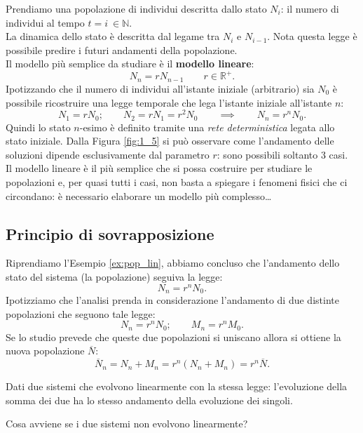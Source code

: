 \noindent
\begin{exmp}
    \label{ex:pop_lin}
   Prendiamo una popolazione di individui descritta dallo stato $N_i$: il numero di individui al tempo $t=i \ \in \mathbb{N}$. \\
   La dinamica dello stato è descritta dal legame tra $N_i$ e $N_{i-1}$. Nota questa legge è possibile predire i futuri andamenti della popolazione.\\
   Il modello più semplice da studiare è il \textbf{modello lineare}:
   \[
       N_n = r N_{n-1} \qquad r \in \mathbb{R}^+
   .\] 
   Ipotizzando che il numero di individui all'istante iniziale (arbitrario) sia $N_0$ è possibile ricostruire una legge temporale che lega l'istante iniziale all'istante $n$:
   \[
       N_1 = rN_0; \qquad N_2 = rN_1=r^2N_0 \qquad \implies \qquad N_n = r^{n}N_0
   .\] 
   Quindi lo stato $n$-esimo è definito tramite una \textit{rete deterministica} legata allo stato iniziale.
   Dalla Figura \ref{fig:1_5} si può osservare come l'andamento delle soluzioni dipende esclusivamente dal parametro $r$: sono possibili soltanto 3 casi.\\
   Il modello lineare è il più semplice che si possa costruire per studiare le popolazioni e, per quasi tutti i casi, non basta a spiegare i fenomeni fisici che ci circondano: è necessario elaborare un modello più complesso\ldots
\end{exmp}
\noindent
\subsection{Principio di sovrapposizione}%
\label{sub:Principio di sovrapposizione}
Riprendiamo l'Esempio \ref{ex:pop_lin}, abbiamo concluso che l'andamento dello stato del sistema (la popolazione) seguiva la legge:
\[
    N_n = r^nN_0
.\] 
Ipotizziamo che l'analisi prenda in considerazione l'andamento di due distinte popolazioni che seguono tale legge:
\[
    N_n = r^nN_0; \qquad M_n = r^nM_0
.\] 
Se lo studio prevede che queste due popolazioni si uniscano allora si ottiene la nuova popolazione $\overline{N}$:
\[
    \overline{N}_n = N_n + M_n = r^n(N_n + M_n) = r^n \overline{N}
.\] 
\begin{thm}
    Dati due sistemi che evolvono linearmente con la stessa legge: l'evoluzione della somma dei due ha lo stesso andamento della evoluzione dei singoli. 
\end{thm}
\noindent
Cosa avviene se i due sistemi non evolvono linearmente?
